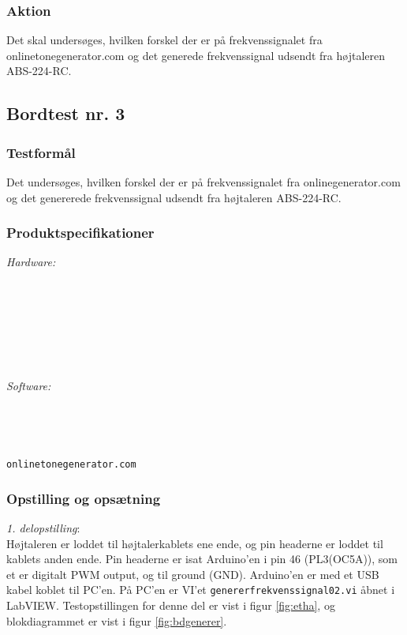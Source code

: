 			\subsubsection{Aktion}
			Det skal undersøges, hvilken forskel der er på frekvenssignalet fra onlinetonegenerator.com og det generede frekvenssignal udsendt fra højtaleren ABS-224-RC.  
	
		\subsection{Bordtest nr. 3} %
		\subsubsection{Testformål}
		Det undersøges, hvilken forskel der er på frekvenssignalet fra onlinegenerator.com og det genererede frekvenssignal udsendt fra højtaleren ABS-224-RC.  
		
		\subsubsection{Produktspecifikationer}
		
		\textit{Hardware:}\\
		\\
		\hojtalerkabel\\
		\pins\\
		\krympeflex
		\arduino\\
		\usbkabel\\
		\PC\\
		\mikrofon\\
	
		\textit{Software:}\\
		\labview\\
		\visa\\
		\vi\\
		\ardsw\\
		\texttt{onlinetonegenerator.com}
		
		\subsubsection{Opstilling og opsætning}
		\textit{1. delopstilling}:\\
		Højtaleren er loddet til højtalerkablets ene ende, og pin headerne er loddet til kablets anden ende. 
		Pin headerne er isat Arduino'en i pin 46 (PL3(OC5A)), som et er digitalt PWM output, og til ground (GND). 
		Arduino'en er med et USB kabel koblet til PC'en. 		
		På PC'en er VI'et \texttt{genererfrekvenssignal02.vi} åbnet i LabVIEW. Testopstillingen for denne del er vist i figur \ref{fig:etha}, og blokdiagrammet er vist i figur \ref{fig:bdgenerer}.\\ 
 
